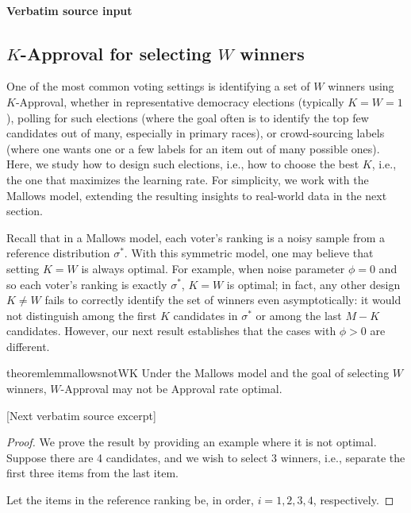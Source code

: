 \documentclass[10pt]{article}
\begin{document}
\paragraph{Verbatim source input}
\begin{ReviewVerbatim}
\subsection{$K$-Approval for selecting $W$ winners}
\label{sec:approvaltheory}
One of the most common voting settings is identifying a set of $W$ winners using $K$-Approval, whether in representative democracy elections (typically $K=W=1$), polling for such elections (where the goal often is to identify the top few candidates out of many, especially in primary races), or crowd-sourcing labels (where one wants one or a few labels for an item out of many possible ones). Here, we study how to design such elections, i.e., how to choose the best $K$, i.e., the one that maximizes the learning rate. For simplicity, we work with the Mallows model, extending the resulting insights to real-world data in the next section.


Recall that in a Mallows model, each voter's ranking is a noisy sample from a reference distribution $\sigma^*$. With this symmetric model, one may believe that setting $K=W$ is always optimal. For example, when noise parameter $\phi = 0$ and so each voter's ranking is exactly $\sigma^*$, $K=W$ is optimal; in fact, any other design $K \neq W$ fails to correctly identify the set of winners even asymptotically: it would not distinguish among the first $K$ candidates in $\sigma^*$ or among the last $M-K$ candidates. However, our next result establishes that the cases with $\phi > 0$ are different.

\begin{restatable}{theorem}{lemmallowsnotWK}
	\label{lem:mallowsnotWK}
	Under the Mallows model and the goal of selecting $W$ winners, $W$-Approval may not be Approval rate optimal.
\end{restatable}

[Next verbatim source excerpt]

\lemmallowsnotWK*
\begin{proof}

	We prove the result by providing an example where it is not optimal. Suppose there are 4 candidates, and we wish to select $3$ winners, i.e., separate the first three items from the last item.


Let the items in the reference ranking be, in order, $i=1, 2, 3, 4$, respectively.


\end{proof}
\end{ReviewVerbatim}
\end{document}
